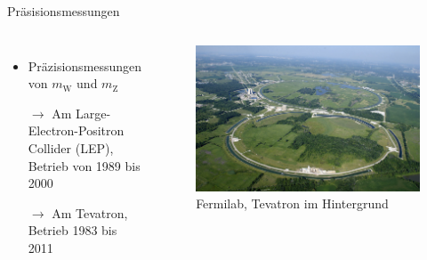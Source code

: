\documentclass[aspectratio=1610, professionalfonts, 10pt]{beamer}
\begin{document}
\begin{frame}{Präsisionsmessungen}
	\begin{columns}
				\begin{itemize}
					\setlength\itemsep{0.5em}
					\vspace*{-20px}
					\item Präzisionsmessungen von $m_\text{W}$ und $m_\text{Z}$
					\item[$\rightarrow$] Am Large-Electron-Positron Collider (LEP), Betrieb von 1989 bis 2000
					\item[$\rightarrow$] Am Tevatron, Betrieb 1983 bis 2011
				\end{itemize}
			\begin{figure}
	  			\centering
				\includegraphics[width=\linewidth]{Images/1200px-Fermilab.jpg}
				\caption{Fermilab, Tevatron im Hintergrund \cite{wiki:tevatron}}
	  			\label{fig:sad}
			\end{figure}
	\end{columns}
\end{frame}
\end{document}
